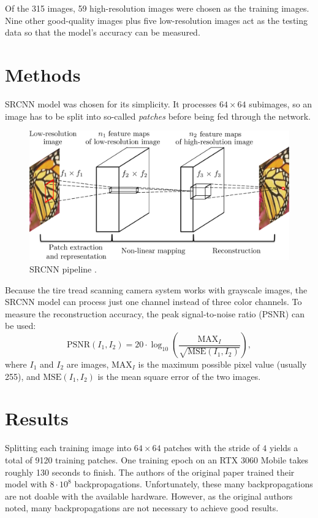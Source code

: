 \documentclass[english]{mvi-report}
\begin{document}
Of the 315 images, 59 high-resolution images were chosen as the training images. Nine other good-quality images plus five low-resolution images act as the testing data so that the model's accuracy can be measured.

\section{Methods}
SRCNN \cite{Dong2014} model was chosen for its simplicity. It processes $64\times64$ subimages, so an image has to be split into so-called \textit{patches} before being fed through the network.

\begin{figure}[htpb]
  \centering
  \includegraphics[width=\linewidth]{media/SRCNN-structure.png}
  \caption{SRCNN pipeline \cite{Dong2014}.}
  \label{fig:srcnn-structure}
\end{figure}

Because the tire tread scanning camera system works with grayscale images, the SRCNN model can process just one channel instead of three color channels. To measure the reconstruction accuracy, the peak signal-to-noise ratio (PSNR) can be used:
\begin{equation*}
  \text{PSNR}(I_1, I_2) = 20 \cdot \log_{10} \left( \frac{\text{MAX}_I}{\sqrt{\text{MSE}(I_1, I_2)}} \right),
\end{equation*}
where $I_1$ and $I_2$ are images, $\text{MAX}_I$ is the maximum possible pixel value (usually 255), and $\text{MSE}(I_1, I_2)$ is the mean square error of the two images.

\section{Results}

Splitting each training image into $64\times64$ patches with the stride of $4$ yields a total of 9120 training patches. One training epoch on an RTX 3060 Mobile takes roughly 130 seconds to finish. The authors of the original paper trained their model with ${8\cdot10^8}$ backpropagations. Unfortunately, these many backpropagations are not doable with the available hardware. However, as the original authors noted, many backpropagations are not necessary to achieve good results.
\end{document}
